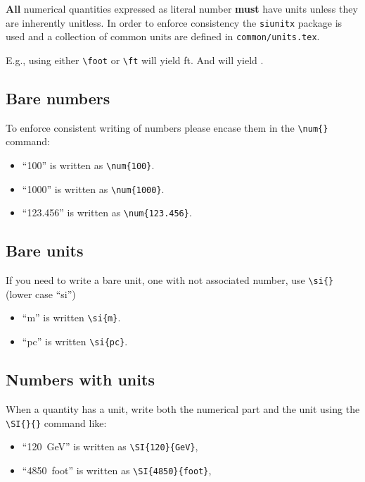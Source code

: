 \textbf{All} numerical quantities expressed as literal number
\textbf{must} have units unless they are inherently unitless.
In order to enforce consistency the \texttt{siunitx} package is used
and a collection of common units are defined in
\texttt{common/units.tex}.

E.g., using either \verb|\foot| or \verb|\ft| will yield ft. And \ktyr will yield \ktyr.

\subsection{Bare numbers}

To enforce consistent writing of numbers please encase them in the
\verb|\num{}| command:

\begin{itemize}
\item ``\num{100}'' is written as \verb|\num{100}|.
\item ``\num{1000}'' is written as \verb|\num{1000}|.
\item ``\num{123.456}'' is written as \verb|\num{123.456}|.
\end{itemize}

\subsection{Bare units}

If you need to write a bare unit, one with not associated number, use
\verb|\si{}| (lower case ``si'')

\begin{itemize}
\item ``\si{m}'' is written \verb|\si{m}|.
\item ``\si{pc}'' is written \verb|\si{pc}|.
\end{itemize}

\subsection{Numbers with units}

When a quantity has a unit, write both the numerical part and the unit
using the \verb|\SI{}{}| command like:

\begin{itemize}
\item ``\SI{120}{GeV}'' is written as \verb|\SI{120}{GeV}|,
\item ``\SI{4850}{foot}'' is written as \verb|\SI{4850}{foot}|,
\end{itemize}

